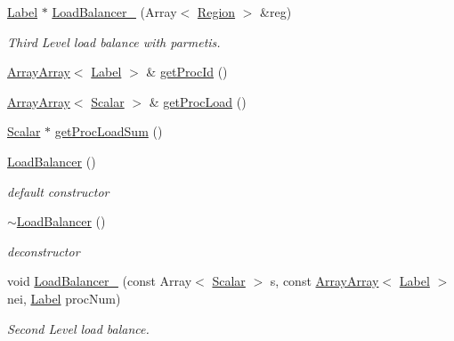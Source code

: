 \begin{DoxyCompactItemize}
\hyperlink{namespaceHSF_ae65d72be782e989396ebe5ec6ae4c2b6}{Label} $\ast$ \hyperlink{classHSF_1_1LoadBalancer_a51cafaff8985b257cff113299e48697f}{LoadBalancer\_} (Array$<$ \hyperlink{classHSF_1_1Region}{Region} $>$ \&reg)
\begin{DoxyCompactList}\small\item\em Third Level load balance with parmetis. \item\end{DoxyCompactList}\item 
\hyperlink{classHSF_1_1ArrayArray}{ArrayArray}$<$ \hyperlink{namespaceHSF_ae65d72be782e989396ebe5ec6ae4c2b6}{Label} $>$ \& \hyperlink{classHSF_1_1LoadBalancer_a934f19588ae53f8f2133ddb0af955e15}{getProcId} ()
\item 
\hyperlink{classHSF_1_1ArrayArray}{ArrayArray}$<$ \hyperlink{namespaceHSF_a7419497552ed1c5631a818b75eed1aec}{Scalar} $>$ \& \hyperlink{classHSF_1_1LoadBalancer_a969ba490fb82cdb116643d670b8c66b2}{getProcLoad} ()
\item 
\hyperlink{namespaceHSF_a7419497552ed1c5631a818b75eed1aec}{Scalar} $\ast$ \hyperlink{classHSF_1_1LoadBalancer_ad25ef85b3641df45c4f62a5dccf15454}{getProcLoadSum} ()
\item 
\hyperlink{classHSF_1_1LoadBalancer_af9fd71150f3cd1b8c4f87023b916dedc}{LoadBalancer} ()
\begin{DoxyCompactList}\small\item\em default constructor \item\end{DoxyCompactList}\item 
\hyperlink{classHSF_1_1LoadBalancer_aa03846f31ea99f255b23adf0777cf373}{$\sim$LoadBalancer} ()
\begin{DoxyCompactList}\small\item\em deconstructor \item\end{DoxyCompactList}\item 
void \hyperlink{classHSF_1_1LoadBalancer_a06147f535aa0c290b332c9578d80d3fa}{LoadBalancer\_} (const Array$<$ \hyperlink{namespaceHSF_a7419497552ed1c5631a818b75eed1aec}{Scalar} $>$ s, const \hyperlink{classHSF_1_1ArrayArray}{ArrayArray}$<$ \hyperlink{namespaceHSF_ae65d72be782e989396ebe5ec6ae4c2b6}{Label} $>$ nei, \hyperlink{namespaceHSF_ae65d72be782e989396ebe5ec6ae4c2b6}{Label} procNum)
\begin{DoxyCompactList}\small\item\em Second Level load balance. \item\end{DoxyCompactList}\item 

\end{DoxyCompactItemize}
